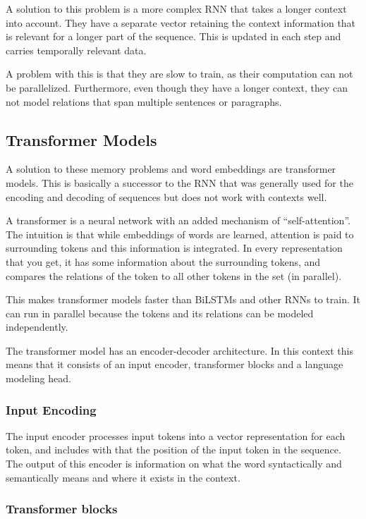 A solution to this problem is a more complex RNN that takes a longer
context into account.
They have a separate vector retaining the context information that is
relevant for a longer
part of the sequence. This is updated in each step and carries
temporally relevant data.

A problem with this is that they are slow to train, as their
computation can not be parallelized.
Furthermore, even though they have a longer context, they can not
model relations that span multiple
sentences or paragraphs.

\subsection{Transformer Models}

A solution to these memory problems and word embeddings are transformer models.
This is basically a successor to the RNN that was generally used for
the encoding
and decoding of sequences but does not work with contexts well.

A transformer is a neural network with an added mechanism of ``self-attention''.
The intuition is that while embeddings of words are learned, attention is paid
to surrounding tokens and this information is integrated. In every
representation
that you get, it has some information about the surrounding tokens,
and compares the
relations of the token to all other tokens in the set (in parallel).

This makes transformer models faster than BiLSTMs and other RNNs to train.
It can run in parallel because the tokens and its relations can be modeled
independently.

The transformer model has an encoder-decoder architecture. In this context this
means that it consists of an input encoder, transformer blocks and a language
modeling head.

\subsubsection{Input Encoding}

The input encoder processes input tokens into a vector representation
for each token,
and includes with that the position of the input token in the
sequence. The output of
this encoder is information on what the word syntactically and
semantically means and
where it exists in the context.

\subsubsection{Transformer blocks}

